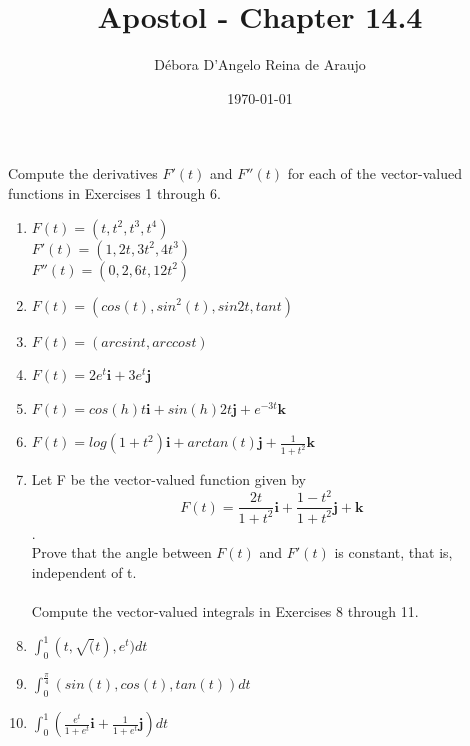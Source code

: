 \documentclass{article}
\begin{document}
\title{Apostol - Chapter 14.4}
\author{Débora D'Angelo Reina de Araujo}
\date{\today}

\maketitle

Compute the derivatives $F'(t)$ and $F''(t)$ for each of the vector-valued functions in Exercises 1 through 6.

\begin{enumerate}
    \item $F(t) = (t, t^2, t^3, t^4)$ \\
        $F'(t) = (1, 2t, 3t^2, 4t^3)$ \\
        $F''(t) = (0, 2, 6t, 12t^2)$
    \item $F(t) = (cos(t), sin^2(t), sin 2t, tan t)$ \
    \item $F(t) = (arcsin t, arccos t)$ \
    \item $F(t) = 2e^t\textbf{i} + 3e^t\textbf{j}$ \
    \item $F(t) = cos(h) t \textbf{i} + sin(h) 2t \textbf{j} + e^{-3t}\textbf{k}$ \
    \item $F(t) = log(1+t^2)\textbf{i} + arctan(t) \textbf{j} + \frac{1}{1+t^2}\textbf{k}$ \
    \item Let F be the vector-valued function given by \\
        $$F(t) = \frac{2t}{1+t^2}\textbf{i} + \frac{1-t^2}{1+t^2}\textbf{j} + \textbf{k}$$. \\
        Prove that the angle between $F(t)$ and $F'(t)$ is constant, that is, independent of t. \\
        \\
    Compute the vector-valued integrals in Exercises 8 through 11. \
    \item $\int_{0}^{1} (t, \sqrt(t), e^t)dt$ \
    \item $\int_{0}^{\frac{\pi}{4}} (sin(t), cos(t), tan(t))dt$ \
    \item $\int_{0}^{1} (\frac{e^t}{1+e^t}\textbf{i} + \frac{1}{1+e^t}\textbf{j})dt$ \
\end{enumerate}
\end{document}
